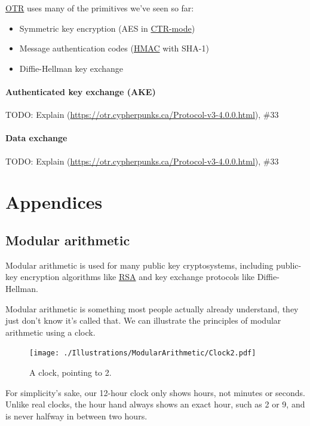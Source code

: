 \documentclass[11pt,ebook,table,dvipsnames]{memoir}
\begin{document}
\hyperref[OTR]{OTR} uses many of the primitives we've seen so far:

\begin{itemize}
\item Symmetric key encryption (\gls{AES} in \hyperref[CTR mode]{CTR-mode})
\item Message authentication codes (\hyperref[HMAC]{HMAC} with SHA-1)
\item Diffie-Hellman key exchange
\end{itemize}

\subsection{Authenticated key exchange (AKE)}
\label{sec-3-3-1-1}

TODO: Explain (\url{https://otr.cypherpunks.ca/Protocol-v3-4.0.0.html}), \#33
\subsection{Data exchange}
\label{sec-3-3-1-2}

TODO: Explain (\url{https://otr.cypherpunks.ca/Protocol-v3-4.0.0.html}), \#33
\part{Appendices}
\label{sec-4}
\appendix
\chapter{Modular arithmetic\label{Modular-arithmetic}}
\label{sec-4-1}

Modular arithmetic is used for many public key cryptosystems,
including \gls{public-key encryption} algorithms like \hyperref[RSA]{RSA} and
\gls{key exchange} protocols like Diffie-Hellman.

Modular arithmetic is something most people actually already
understand, they just don't know it's called that. We can illustrate
the principles of modular arithmetic using a clock.

\begin{figure}[ht!]
\centering
\texttt{[image: ./Illustrations/ModularArithmetic/Clock2.pdf]}
\caption{A clock, pointing to 2.}
\end{figure}

For simplicity's sake, our 12-hour clock only shows hours, not minutes
or seconds. Unlike real clocks, the hour hand always shows an exact
hour, such as 2 or 9, and is never halfway in between two hours.
\end{document}
